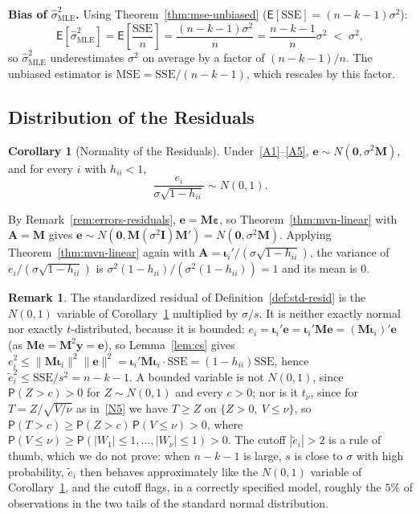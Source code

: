 \documentclass[12pt,a4paper]{article}
\makeatletter
\theoremstyle{definition}
\newtheorem{corollary}[theorem]{Corollary}
\newtheorem{remark}[theorem]{Remark}
\renewenvironment{proof}[1][\proofname]{\par
  \pushQED{\qed}%
  \normalfont \topsep6\p@\@plus6\p@\relax
  \trivlist
  \item[\hskip\labelsep\bfseries #1\@addpunct{.}]\ignorespaces
}{%
  \popQED\endtrivlist\@endpefalse
}
\newcommand\expc{\mathsf{E}}
\newcommand\prb{\mathsf{P}}
\newcommand{\SSE}{\mathrm{SSE}}
\newcommand{\MSE}{\mathrm{MSE}}
\newcommand{\by}{\mathbf{y}}
\newcommand{\be}{\boldsymbol{\varepsilon}}
\newcommand{\bI}{\mathbf{I}}
\newcommand{\bM}{\mathbf{M}}
\newcommand{\bzero}{\mathbf{0}}
\newcommand{\bA}{\mathbf{A}}
\makeatother
\begin{document}
\begin{proof}
\textbf{Bias of $\hat{\sigma}^2_{\mathrm{MLE}}$.} Using Theorem~\ref{thm:mse-unbiased} ($\expc[\SSE] = (n-k-1)\sigma^2$):
\[
\expc[\hat{\sigma}^2_{\mathrm{MLE}}] = \expc\!\left[\frac{\SSE}{n}\right] = \frac{(n-k-1)\sigma^2}{n} = \frac{n-k-1}{n}\sigma^2 \;<\; \sigma^2,
\]
so $\hat{\sigma}^2_{\mathrm{MLE}}$ underestimates $\sigma^2$ on average by a factor of $(n-k-1)/n$. The unbiased estimator is $\MSE = \SSE/(n-k-1)$, which rescales by this factor.
\end{proof}

\subsection{Distribution of the Residuals}

\begin{corollary}[Normality of the Residuals]\label{cor:resid-normal}
Under~\ref{A1}--\ref{A5}, $\mathbf{e} \sim N(\bzero, \sigma^2\bM)$, and for every $i$ with $h_{ii} < 1$,
\[
\frac{e_i}{\sigma\sqrt{1 - h_{ii}}} \sim N(0, 1).
\]
\end{corollary}

\begin{proof}
By Remark~\ref{rem:errors-residuals}, $\mathbf{e} = \bM\be$, so Theorem~\ref{thm:mvn-linear} with $\bA = \bM$ gives $\mathbf{e} \sim N(\bzero, \bM(\sigma^2\bI)\bM') = N(\bzero, \sigma^2\bM)$. Applying Theorem~\ref{thm:mvn-linear} again with $\bA = \boldsymbol\iota_i'/(\sigma\sqrt{1 - h_{ii}})$, the variance of $e_i/(\sigma\sqrt{1 - h_{ii}})$ is $\sigma^2(1 - h_{ii})/(\sigma^2(1 - h_{ii})) = 1$ and its mean is $0$.
\end{proof}

\begin{remark}\label{rem:std-resid-law}
The standardized residual of Definition~\ref{def:std-resid} is the $N(0,1)$ variable of Corollary~\ref{cor:resid-normal} multiplied by $\sigma/s$. It is neither exactly normal nor exactly $t$-distributed, because it is bounded: $e_i = \boldsymbol\iota_i'\mathbf{e} = \boldsymbol\iota_i'\bM\mathbf{e} = (\bM\boldsymbol\iota_i)'\mathbf{e}$ (as $\bM\mathbf{e} = \bM^2\by = \mathbf{e}$), so Lemma~\ref{lem:cs} gives $e_i^2 \leqslant \|\bM\boldsymbol\iota_i\|^2\|\mathbf{e}\|^2 = \boldsymbol\iota_i'\bM\boldsymbol\iota_i \cdot \SSE = (1 - h_{ii})\SSE$, hence $\tilde e_i^2 \leqslant \SSE/s^2 = n - k - 1$. A bounded variable is not $N(0,1)$, since $\prb(Z > c) > 0$ for $Z \sim N(0,1)$ and every $c > 0$; nor is it $t_\nu$, since for $T = Z/\sqrt{V/\nu}$ as in~\ref{N5} we have $T \geqslant Z$ on $\{Z > 0,\ V \leqslant \nu\}$, so $\prb(T > c) \geqslant \prb(Z > c)\,\prb(V \leqslant \nu) > 0$, where $\prb(V \leqslant \nu) \geqslant \prb(|W_1| \leqslant 1, \ldots, |W_\nu| \leqslant 1) > 0$. The cutoff $|\tilde e_i| > 2$ is a rule of thumb, which we do not prove: when $n - k - 1$ is large, $s$ is close to $\sigma$ with high probability, $\tilde e_i$ then behaves approximately like the $N(0,1)$ variable of Corollary~\ref{cor:resid-normal}, and the cutoff flags, in a correctly specified model, roughly the $5\%$ of observations in the two tails of the standard normal distribution.
\end{remark}
\end{document}
